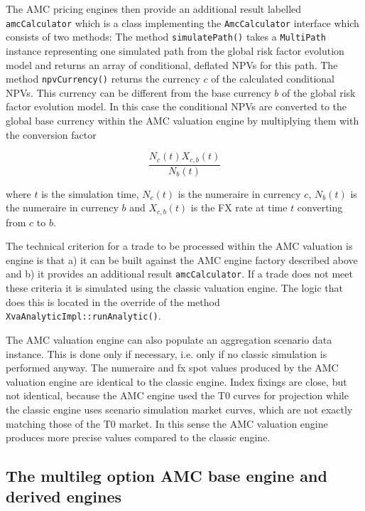 \documentclass[12pt, a4paper]{article}
\begin{document}
The AMC pricing engines then provide an additional result labelled \verb+amcCalculator+ which is a class implementing
the \verb+AmcCalculator+ interface which consists of two methods: The method \verb+simulatePath()+ takes a
\verb+MultiPath+ instance representing one simulated path from the global risk factor evolution model and returns an
array of conditional, deflated NPVs for this path. The method \verb+npvCurrency()+ returns the currency $c$ of the
calculated conditional NPVs. This currency can be different from the base currency $b$ of the global risk factor
evolution model. In this case the conditional NPVs are converted to the global base currency within the AMC valuation
engine by multiplying them with the conversion factor

\begin{equation}\label{currency_conversion_factor}
\frac{N_c(t) X_{c,b}(t)}{N_b(t)}
\end{equation}

where $t$ is the simulation time, $N_c(t)$ is the numeraire in currency $c$, $N_b(t)$ is the numeraire in currency
$b$ and $X_{c,b}(t)$ is the FX rate at time $t$ converting from $c$ to $b$.

The technical criterion for a trade to be processed within the AMC valuation is engine is that a) it can be built
against the AMC engine factory described above and b) it provides an additional result \verb+amcCalculator+. If a trade
does not meet these criteria it is simulated using the classic valuation engine. The logic that does this is located in
the override of the method \verb+XvaAnalyticImpl::runAnalytic()+.

The AMC valuation engine can also populate an aggregation scenario data instance. This is done only if necessary,
i.e. only if no classic simulation is performed anyway. The numeraire and fx spot values produced by the AMC valuation
engine are identical to the classic engine. Index fixings are close, but not identical, because the AMC engine used the
T0 curves for projection while the classic engine uses scenario simulation market curves, which are not exactly matching
those of the T0 market. In this sense the AMC valuation engine produces more precise values compared to the classic
engine.

\subsection{The multileg option AMC base engine and derived engines}\label{sec:amc_base_engine}
\end{document}
